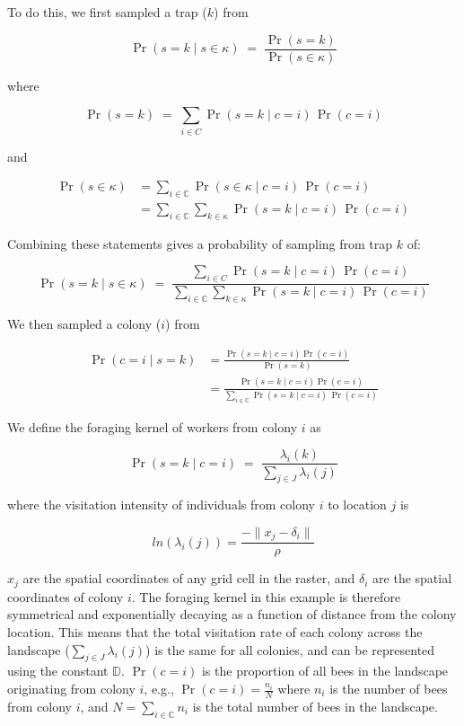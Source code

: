 \documentclass[12pt]{article}
\begin{document}
To do this, we first sampled a trap ($k$) from

\[
\Pr(s = k \mid s \in \kappa) \;=\; \frac{\Pr(s = k)}{\Pr(s \in \kappa)} \tag{1}
\]

where

\[
\Pr(s = k) \;=\; \sum_{i \in C} \Pr(s = k \mid c = i)\,\Pr(c = i)
\]

and

\begin{align*}
\Pr(s \in \kappa) 
    &= \sum_{i \in \mathbb{C}} \Pr(s \in \kappa \mid c = i)\,\Pr(c = i) \\[0.5em]
    &= \sum_{i \in \mathbb{C}} \sum_{k \in \kappa} \Pr(s = k \mid c = i)\,\Pr(c = i)
\end{align*}


Combining these statements gives a probability of sampling from trap $k$ of:

\[
\Pr(s = k \mid s \in \kappa) \;=\; \frac{\sum_{i \in C} \Pr(s = k \mid c = i)\,\Pr(c = i)}{\sum_{i \in \mathbb{C}} \sum_{k \in \kappa} \Pr(s = k \mid c = i)\,\Pr(c = i)} \tag{2}
\]

We then sampled a colony ($i$) from

\begin{align*}
\Pr(c = i \mid s = k)
  &= \frac{\Pr(s = k \mid c = i) \Pr(c = i)}{\Pr(s = k)} \\[0.5em]
  &= \frac{\Pr(s = k \mid c = i) \Pr(c = i)}{\sum_{i \in \mathbb{C}} \Pr(s = k \mid c = i)\,\Pr(c = i)} \tag{3}
\end{align*}


We define the foraging kernel of workers from colony $i$ as

\[
\Pr(s = k \mid c = i)
\;=\; 
\frac{\lambda_i(k)}{\sum_{j \in J} \lambda_i(j)} \tag{4}
\]

where the visitation intensity of individuals from colony $i$ to location $j$ is 

\[
ln(\lambda_i(j)) = \frac{- \lVert x_j - \delta_i \rVert}{\rho} \tag{5}
\]

$x_j$ are the spatial coordinates of any grid cell in the raster, and $\delta_i$ are the spatial coordinates of colony $i$. The foraging kernel in this example is therefore symmetrical and exponentially decaying as a function of distance from the colony location. This means that the total visitation rate of each colony across the landscape ($\sum_{j \in J} \lambda_i(j)$) is the same for all colonies, and can be represented using the constant $\mathbb{D}$. $\Pr(c = i)$ is the proportion of all bees in the landscape originating from colony $i$, e.g., $\Pr(c = i) = \frac{n_i}{N}$ where $n_i$ is the number of bees from colony $i$, and $N = \sum_{i \in \mathbb{C}} n_i$ is the total number of bees in the landscape.
\end{document}

